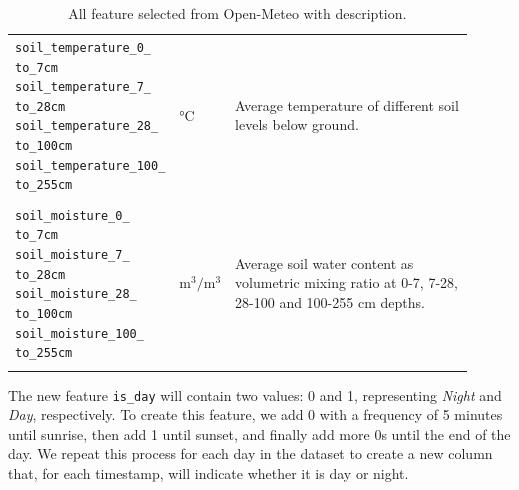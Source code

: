 \begin{longtable}[c]{p{0.3\linewidth}|p{0.07\linewidth}| p{0.54\linewidth}}
	\verb|soil_temperature_0_| \verb|   to_7cm| \verb|soil_temperature_7_| \verb|   to_28cm| \verb|soil_temperature_28_| \verb|   to_100cm| \verb|soil_temperature_100_| \verb|   to_255cm| & °C                      & Average temperature of different soil levels below ground.                                                                                                                                                                                                                                             \\
	                                                                                                                                                                                        &                         &                                                                                                                                                                                                                                                                                                        \\
	\verb|soil_moisture_0_| \verb|   to_7cm| \verb|soil_moisture_7_| \verb|   to_28cm| \verb|soil_moisture_28_| \verb|   to_100cm| \verb|soil_moisture_100_| \verb|   to_255cm|             & $\text{m}^3/\text{m}^3$ & Average soil water content as volumetric mixing ratio at 0-7, 7-28, 28-100 and 100-255 cm depths.                                                                                                                                                                                                      \\
	\caption{All feature selected from Open-Meteo with description\cite{openmeteo}.}\label{tab:openmeteofeatures}
\end{longtable}

The new feature \texttt{is\_day} will contain two values: 0 and 1,
representing \textit{Night} and \textit{Day}, respectively.
To create this feature, we add 0 with a frequency of 5 minutes until sunrise,
then add 1 until sunset, and finally add more 0s until the end of the day.
We repeat this process for each day in the dataset to create a new column that,
for each timestamp, will indicate whether it is day or night.


